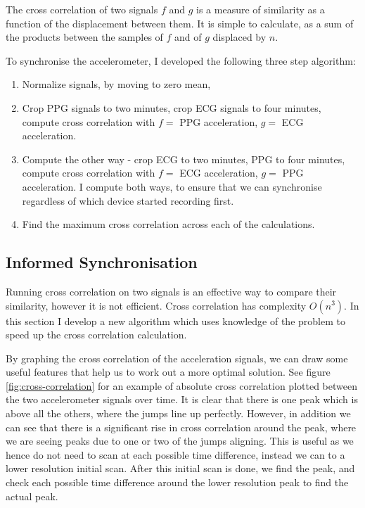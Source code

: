 \documentclass[12pt,a4paper,twoside,openright]{report}
\begin{document}
The cross correlation of two signals \(f\) and \(g\) is a measure of
similarity as a function of the displacement between them. It is simple to
calculate, as a sum of the products between the samples of \(f\) and of \(g\)
displaced by \(n\).

To synchronise the accelerometer, I developed the following three step 
algorithm:
\begin{enumerate}
	\item Normalize signals, by moving to zero mean, 

	\item Crop PPG signals to two minutes, crop ECG signals to four
		minutes, compute cross correlation with \(f=\) PPG
		acceleration, \(g=\) ECG acceleration.

	\item Compute the other way - crop ECG to two minutes, PPG to four
		minutes, compute cross correlation with \(f=\) ECG
		acceleration, \(g=\) PPG acceleration. I compute both ways, to
		ensure that we can synchronise regardless of which device
		started recording first.

	\item Find the maximum cross correlation across each of the
		calculations.







\end{enumerate}

\subsection{Informed Synchronisation}

Running cross correlation on two signals is an effective way to compare their
similarity, however it is not efficient. Cross correlation has complexity
\(O(n^3)\). In this section I develop a new algorithm which uses knowledge of
the problem to speed up the cross correlation calculation.

By graphing the cross correlation of the acceleration signals, we can draw
some useful features that help us to work out a more optimal solution. See
figure \ref{fig:cross-correlation} for an example of absolute cross correlation plotted
between the two accelerometer signals over time. It is clear that there is one
peak which is above all the others, where the jumps line up perfectly.
However, in addition we can see that there is a significant rise in cross
correlation around the peak, where we are seeing peaks due to one or two of
the jumps aligning. This is useful as we hence do not need to scan at each
possible time difference, instead we can to a lower resolution initial scan.
After this initial scan is done, we find the peak, and check each possible
time difference around the lower resolution peak to find the actual peak.
\end{document}
